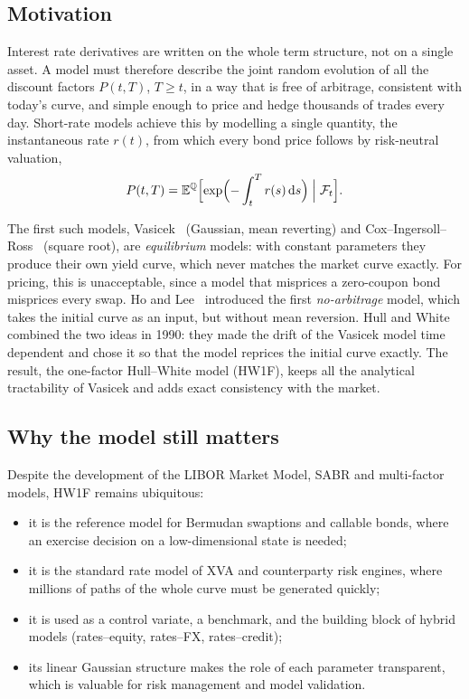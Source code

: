 \documentclass[11pt,a4paper]{article}
\theoremstyle{plain}
\theoremstyle{definition}
\newcommand{\dd}{\mathrm{d}}
\newcommand{\E}{\mathbb{E}}
\newcommand{\Q}{\mathbb{Q}}
\newcommand{\F}{\mathcal{F}}
\begin{document}
\subsection{Motivation}
Interest rate derivatives are written on the whole term structure, not on a single asset. A model must therefore describe the joint random evolution of all the discount factors $P(t,T)$, $T\geq t$, in a way that is free of arbitrage, consistent with today's curve, and simple enough to price and hedge thousands of trades every day. Short-rate models achieve this by modelling a single quantity, the instantaneous rate $r(t)$, from which every bond price follows by risk-neutral valuation,
\begin{equation}
    P(t,T)=\E^{\Q}\Bigl[\exp\Bigl(-\int_t^T r(s)\,\dd s\Bigr)\Bigm|\F_t\Bigr].
    \label{eq:bond-def}
\end{equation}

The first such models, Vasicek~\cite{vasicek} (Gaussian, mean reverting) and Cox--Ingersoll--Ross~\cite{cir} (square root), are \emph{equilibrium} models: with constant parameters they produce their own yield curve, which never matches the market curve exactly. For pricing, this is unacceptable, since a model that misprices a zero-coupon bond misprices every swap. Ho and Lee~\cite{holee} introduced the first \emph{no-arbitrage} model, which takes the initial curve as an input, but without mean reversion. Hull and White~\cite{hullwhite} combined the two ideas in 1990: they made the drift of the Vasicek model time dependent and chose it so that the model reprices the initial curve exactly. The result, the one-factor Hull--White model (HW1F), keeps all the analytical tractability of Vasicek and adds exact consistency with the market.

\subsection{Why the model still matters}
Despite the development of the LIBOR Market Model, SABR and multi-factor models, HW1F remains ubiquitous:
\begin{itemize}
    \item it is the reference model for Bermudan swaptions and callable bonds, where an exercise decision on a low-dimensional state is needed;
    \item it is the standard rate model of XVA and counterparty risk engines, where millions of paths of the whole curve must be generated quickly;
    \item it is used as a control variate, a benchmark, and the building block of hybrid models (rates--equity, rates--FX, rates--credit);
    \item its linear Gaussian structure makes the role of each parameter transparent, which is valuable for risk management and model validation.
\end{itemize}
\end{document}
